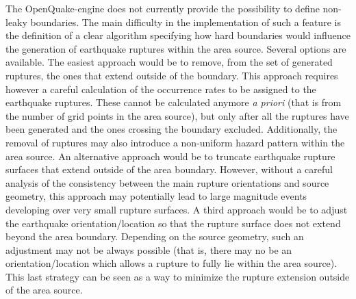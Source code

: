 The OpenQuake-engine does not currently provide the possibility to define
non-leaky boundaries. The main difficulty in the implementation of such a
feature is the definition of a clear algorithm specifying how hard boundaries
would influence the generation of earthquake ruptures within the area source.
Several options are available. The easiest approach would be to remove, from the
set of generated ruptures, the ones that extend outside of the boundary. This
approach requires however a careful calculation of the occurrence rates to be
assigned to the earthquake ruptures. These cannot be calculated anymore
\textit{a priori} (that is from the number of grid points in the area source),
but only after all the ruptures have been generated and the ones crossing the
boundary excluded. Additionally, the removal of ruptures may also introduce a
non-uniform hazard pattern within the area source. An alternative approach would
be to truncate earthquake rupture surfaces that extend outside of the area
boundary. However, without a careful analysis of the consistency between the
main rupture orientations and source geometry, this approach may potentially
lead to large magnitude events developing over very small rupture surfaces. A
third approach would be to adjust the earthquake orientation/location so that
the rupture surface does not extend beyond the area boundary. Depending on the
source geometry, such an adjustment may not be always possible (that is, there
may no be an orientation/location which allows a rupture to fully lie within the
area source). This last strategy can be seen as a way to minimize the rupture
extension outside of the area source.

